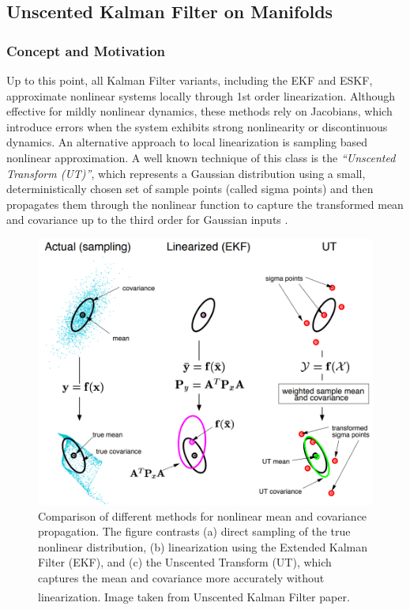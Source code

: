 \subsection{Unscented Kalman Filter on Manifolds}
\subsubsection{Concept and Motivation}
Up to this point, all Kalman Filter variants, including the EKF and ESKF, approximate nonlinear systems locally through 1st order linearization. Although effective for mildly nonlinear dynamics, these methods rely on Jacobians, which introduce errors when the system exhibits strong nonlinearity or discontinuous dynamics. An alternative approach to local linearization is sampling based nonlinear approximation. A well known technique of this class is the \textit{``Unscented Transform (UT)''}, which represents a Gaussian distribution using a small, deterministically chosen set of sample points (called sigma points) and then propagates them through the nonlinear function to capture the transformed mean and covariance up to the third order for Gaussian inputs \cite{ukf}.
\begin{figure}[H]
    \centering
    \includegraphics[width=0.7\linewidth]{Pictures/State_Estimation/Unscented_Kalman_Filter_on_Manifolds/Unscented_Transform.png}
    \caption{Comparison of different methods for nonlinear mean and covariance propagation. The figure contrasts (a) direct sampling of the true nonlinear distribution, (b) linearization using the Extended Kalman Filter (EKF), and (c) the Unscented Transform (UT), which captures the mean and covariance more accurately without linearization. Image taken from Unscented Kalman Filter paper.\textsuperscript{\cite{ukf}}}
    \label{fig:state-estimation-uncented-transform}
\end{figure}




